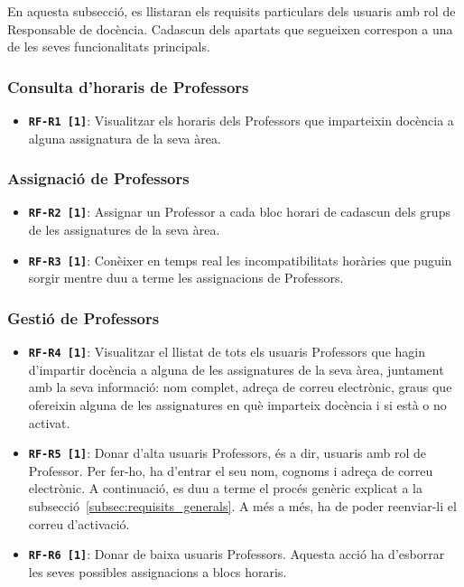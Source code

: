 \documentclass[a4paper,12pt]{ThesisStyle}
\begin{document}
En aquesta subsecció, es llistaran els requisits particulars dels usuaris amb rol de Responsable de docència. Cadascun dels apartats que segueixen correspon a una de les seves funcionalitats principals.

\subsubsection{Consulta d'horaris de Professors}
\begin{itemize}
  \item \texttt{\textbf{RF-R1 [1]}}: Visualitzar els horaris dels Professors que imparteixin docència a alguna assignatura de la seva àrea.
\end{itemize}

\subsubsection{Assignació de Professors}
\begin{itemize}
  \item \texttt{\textbf{RF-R2 [1]}}: Assignar un Professor a cada bloc horari de cadascun dels grups de les assignatures de la seva àrea.
  \item \texttt{\textbf{RF-R3 [1]}}: Conèixer en temps real les incompatibilitats horàries que puguin sorgir mentre duu a terme les assignacions de Professors.
\end{itemize}

\subsubsection{Gestió de Professors}
\begin{itemize}
  \item \texttt{\textbf{RF-R4 [1]}}: Visualitzar el llistat de tots els usuaris Professors que hagin d'impartir docència a alguna de les assignatures de la seva àrea, juntament amb la seva informació: nom complet, adreça de correu electrònic, graus que ofereixin alguna de les assignatures en què imparteix docència i si està o no activat.
  \item \texttt{\textbf{RF-R5 [1]}}: Donar d'alta usuaris Professors, és a dir, usuaris amb rol de Professor. Per fer-ho, ha d'entrar el seu nom, cognoms i adreça de correu electrònic. A continuació, es duu a terme el procés genèric explicat a la subsecció~\ref{subsec:requisits_generals}. A més a més, ha de poder reenviar-li el correu d'activació.
  \item \texttt{\textbf{RF-R6 [1]}}: Donar de baixa usuaris Professors. Aquesta acció ha d'esborrar les seves possibles assignacions a blocs horaris.
\end{itemize}
\end{document}

